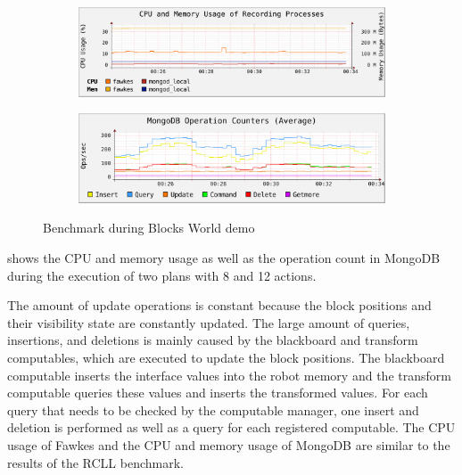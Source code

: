 \begin{figure}
  \centering
  \begin{subfigure}[b]{1\textwidth}
    \includegraphics[width=\textwidth]{plots/blocksworld/cpu-mem}
    \label{fig:blocks-cpu-mem}
  \end{subfigure}
  \begin{subfigure}[b]{1\textwidth}
    \includegraphics[width=\textwidth]{plots/blocksworld/operations}
    \label{fig:blocks-ops}
  \end{subfigure}
  \caption[Benchmark during Blocks World demo]{Benchmark during Blocks World demo}
  \label{fig:blocks-benchmark}
\end{figure}
 shows the CPU and memory usage as well as the
operation count in MongoDB during the execution of two plans with 8
and 12 actions.  

The amount of update operations is constant because the block
positions and their visibility state are constantly updated. The large
amount of queries, insertions, and deletions is mainly caused by the
blackboard and transform computables, which are executed to update the
block positions. The blackboard computable inserts the interface
values into the robot memory and the transform computable queries
these values and inserts the transformed values. For each query that
needs to be checked by the computable manager, one insert and deletion
is performed as well as a query for each registered computable.  The
CPU usage of Fawkes and the CPU and memory usage of MongoDB are similar
to the results of the RCLL benchmark.



